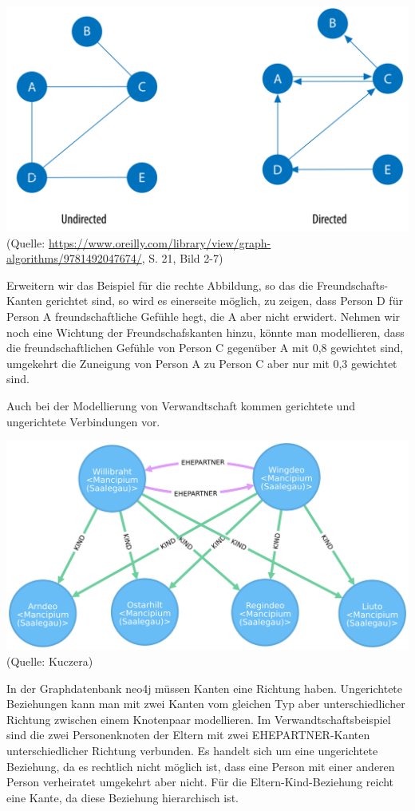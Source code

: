 \documentclass[12pt,ngerman,]{article}
\begin{document}
\includegraphics{Bilder/Graph-Algorithms/21-2-7-UnDirected.png} (Quelle:
\href{Needham/Hodler\%202019}{https://www.oreilly.com/library/view/graph-algorithms/9781492047674/},
S. 21, Bild 2-7)

Erweitern wir das Beispiel für die rechte Abbildung, so das die
Freundschafts-Kanten gerichtet sind, so wird es einerseite möglich, zu
zeigen, dass Person D für Person A freundschaftliche Gefühle hegt, die A
aber nicht erwidert. Nehmen wir noch eine Wichtung der
Freundschafskanten hinzu, könnte man modellieren, dass die
freundschaftlichen Gefühle von Person C gegenüber A mit 0,8 gewichtet
sind, umgekehrt die Zuneigung von Person A zu Person C aber nur mit 0,3
gewichtet sind.

Auch bei der Modellierung von Verwandtschaft kommen gerichtete und
ungerichtete Verbindungen vor.

\includegraphics{Bilder/NomenEtGensBeispiel1.png} (Quelle: Kuczera)

In der Graphdatenbank neo4j müssen Kanten eine Richtung haben.
Ungerichtete Beziehungen kann man mit zwei Kanten vom gleichen Typ aber
unterschiedlicher Richtung zwischen einem Knotenpaar modellieren. Im
Verwandtschaftsbeispiel sind die zwei Personenknoten der Eltern mit zwei
EHEPARTNER-Kanten unterschiedlicher Richtung verbunden. Es handelt sich
um eine ungerichtete Beziehung, da es rechtlich nicht möglich ist, dass
eine Person mit einer anderen Person verheiratet umgekehrt aber nicht.
Für die Eltern-Kind-Beziehung reicht eine Kante, da diese Beziehung
hierarchisch ist.
\end{document}
